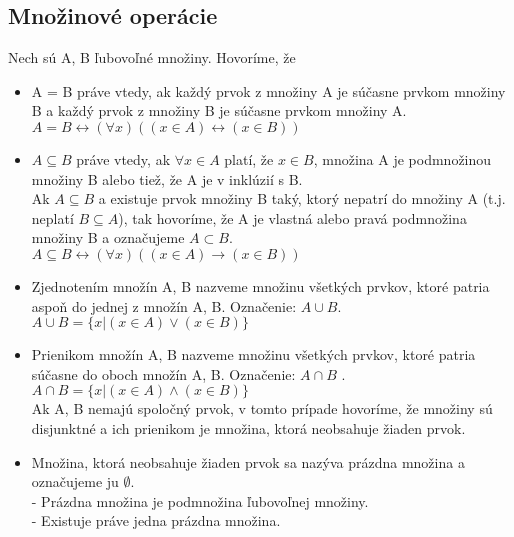   \subsection{Množinové operácie}
  Nech sú A, B ľubovoľné množiny.
  Hovoríme, že
  \begin{itemize}
    \item A = B práve vtedy, ak každý prvok z množiny A je súčasne prvkom množiny B a každý prvok z množiny B je súčasne prvkom množiny A. \\
    $A = B \leftrightarrow  (\forall x)((x \in A) \leftrightarrow  (x \in B))$\\

    \item $A \subseteq B$ práve vtedy, ak $\forall x \in A$ platí, že $x \in B$, množina A je podmnožinou množiny B alebo tiež, že A je v inklúzií s B. \\
    Ak $A \subseteq B$ a existuje prvok množiny B taký, ktorý nepatrí do množiny A (t.j. neplatí $B \subseteq A$), tak hovoríme, že A je vlastná alebo pravá podmnožina množiny B a označujeme $A \subset B$.\\
    $A \subseteq B \leftrightarrow  (\forall x)(( x\in A) \rightarrow ( x\in B))$\\

    \item Zjednotením množín A, B nazveme množinu všetkých prvkov, ktoré patria aspoň do jednej z množín A, B. Označenie: $A \cup B$.\\
    $A \cup B = \{ x | ( x \in A) \vee ( x \in B )\}$ \\

    \item Prienikom množín A, B nazveme množinu všetkých prvkov, ktoré patria súčasne do oboch množín A, B. Označenie: $A \cap B$ .\\
    $A \cap B = \{ x | ( x \in A) \wedge ( x \in B)\} $\\
    Ak A, B nemajú spoločný prvok, v tomto prípade hovoríme, že množiny sú disjunktné a ich prienikom je množina, ktorá neobsahuje žiaden prvok.\\

    \item Množina, ktorá neobsahuje žiaden prvok sa nazýva prázdna množina a označujeme ju $\emptyset$.\\ 
      - Prázdna množina je podmnožina ľubovoľnej množiny. \\
      - Existuje práve jedna prázdna množina. \\


\end{itemize}
